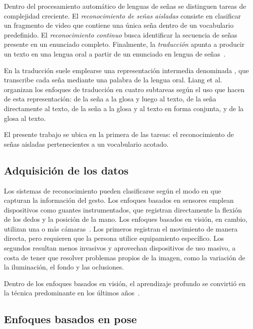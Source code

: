 Dentro del procesamiento automático de lenguas de señas se distinguen tareas de complejidad creciente. El \emph{reconocimiento de señas aisladas} consiste en clasificar un fragmento de video que contiene una única seña dentro de un vocabulario predefinido. El \emph{reconocimiento continuo} busca identificar la secuencia de señas presente en un enunciado completo. Finalmente, la \emph{traducción} apunta a producir un texto en una lengua oral a partir de un enunciado en lengua de señas~\cite{ronchetti2016lsa64, liang2023survey}.

En la traducción suele emplearse una representación intermedia denominada , que transcribe cada seña mediante una palabra de la lengua oral. Liang et al.~\cite{liang2023survey} organizan los enfoques de traducción en cuatro subtareas según el uso que hacen de esta representación: de la seña a la glosa y luego al texto, de la seña directamente al texto, de la seña a la glosa y al texto en forma conjunta, y de la glosa al texto.

El presente trabajo se ubica en la primera de las tareas: el reconocimiento de señas aisladas pertenecientes a un vocabulario acotado.

\subsection{Adquisición de los datos}

Los sistemas de reconocimiento pueden clasificarse según el modo en que capturan la información del gesto. Los enfoques basados en sensores emplean dispositivos como guantes instrumentados, que registran directamente la flexión de los dedos y la posición de la mano. Los enfoques basados en visión, en cambio, utilizan una o más cámaras~\cite{cheok2019review}. Los primeros registran el movimiento de manera directa, pero requieren que la persona utilice equipamiento específico. Los segundos resultan menos invasivos y aprovechan dispositivos de uso masivo, a costa de tener que resolver problemas propios de la imagen, como la variación de la iluminación, el fondo y las oclusiones.

Dentro de los enfoques basados en visión, el aprendizaje profundo se convirtió en la técnica predominante en los últimos años~\cite{rastgoo2021survey}.

\subsection{Enfoques basados en pose}

